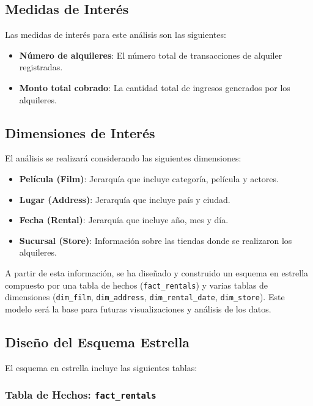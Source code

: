 \documentclass{article}
\begin{document}
\subsection{Medidas de Interés}

Las medidas de interés para este análisis son las siguientes:
\begin{itemize}
    \item \textbf{Número de alquileres}: El número total de transacciones de alquiler registradas.
    \item \textbf{Monto total cobrado}: La cantidad total de ingresos generados por los alquileres.
\end{itemize}

\subsection{Dimensiones de Interés}

El análisis se realizará considerando las siguientes dimensiones:
\begin{itemize}
    \item \textbf{Película (Film)}: Jerarquía que incluye categoría, película y actores.
    \item \textbf{Lugar (Address)}: Jerarquía que incluye país y ciudad.
    \item \textbf{Fecha (Rental)}: Jerarquía que incluye año, mes y día.
    \item \textbf{Sucursal (Store)}: Información sobre las tiendas donde se realizaron los alquileres.
\end{itemize}

A partir de esta información, se ha diseñado y construido un esquema en estrella compuesto por una tabla de hechos (\texttt{fact\_rentals}) y varias tablas de dimensiones (\texttt{dim\_film}, \texttt{dim\_address}, \texttt{dim\_rental\_date}, \texttt{dim\_store}). Este modelo será la base para futuras visualizaciones y análisis de los datos.

\subsection{Diseño del Esquema Estrella}

El esquema en estrella incluye las siguientes tablas:

\subsubsection{Tabla de Hechos: \texttt{fact\_rentals}}
\end{document}

